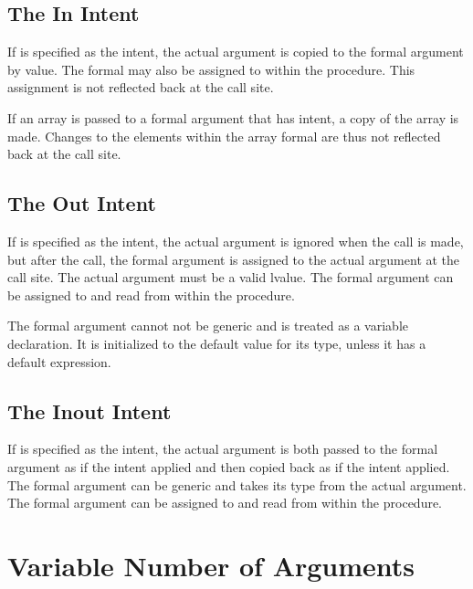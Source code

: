 \subsection{The In Intent}
\label{The_In_Intent}

If  is specified as the intent, the actual argument is copied
to the formal argument by value.
The formal may also be assigned to within
the procedure.  This assignment is not reflected back at the call site.

If an array is passed to a formal argument that has  intent,
a copy of the array is made.  Changes to the elements
within the array formal are thus not reflected back at the call site.

\subsection{The Out Intent}
\label{The_Out_Intent}

If  is specified as the intent, the actual argument is
ignored when the call is made, but after the call, the formal argument
is assigned to the actual argument at the call site.  The actual
argument must be a valid lvalue.  The formal argument can be assigned
to and read from within the procedure.

The formal argument cannot not be generic and is treated as a variable
declaration. It is initialized to the default value for its type,
unless it has a default expression.

\subsection{The Inout Intent}
\label{The_Inout_Intent}

If  is specified as the intent, the actual argument is
both passed to the formal argument as if the  intent applied
and then copied back as if the  intent applied.  The formal
argument can be generic and takes its type from the actual argument.
The formal argument can be assigned to and read from within the
procedure.


\section{Variable Number of Arguments}
\label{Variable_Length_Argument_Lists}

